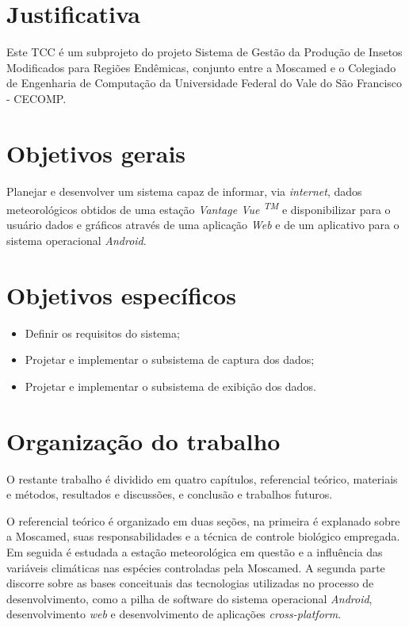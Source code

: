 \section{Justificativa}

Este TCC é um subprojeto do projeto Sistema de Gestão da Produção de Insetos Modificados para Regiões Endêmicas, conjunto entre a Moscamed e o Colegiado de Engenharia de Computação da Universidade Federal do Vale do São Francisco - CECOMP.


\section{Objetivos gerais}

Planejar e desenvolver um sistema capaz de informar, via \textit{internet}, dados meteorológicos obtidos de uma estação \textit{Vantage Vue \textsuperscript{TM}} e disponibilizar para o usuário dados e gráficos através de uma aplicação \textit{Web} e de um aplicativo para o sistema operacional \textit{Android}.

\section{Objetivos específicos}

\begin{itemize}
	\item Definir os requisitos do sistema;
    \item Projetar e implementar o subsistema de captura dos dados;
    \item Projetar e implementar o subsistema de exibição dos dados.

\end{itemize}

\section{Organização do trabalho}

O restante trabalho é dividido em quatro capítulos, referencial teórico, materiais e métodos, resultados e discussões, e conclusão e trabalhos futuros.

O referencial teórico é organizado em duas seções, na primeira é explanado sobre a Moscamed, suas responsabilidades e a técnica de controle biológico empregada. Em seguida é estudada a estação meteorológica em questão e a influência das variáveis climáticas nas espécies controladas pela Moscamed. A segunda parte discorre sobre as bases conceituais das tecnologias utilizadas no processo de desenvolvimento, como a pilha de software do sistema operacional \textit{Android}, desenvolvimento \textit{web} e desenvolvimento de aplicações \textit{cross-platform}.

